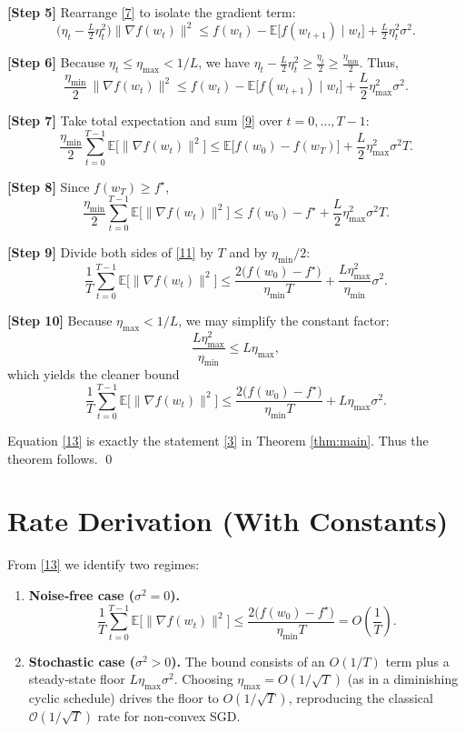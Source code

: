 \documentclass{article}
\newcommand{\E}{\mathbb{E}}
\begin{document}
\noindent\textbf{[Step 5]} Rearrange \eqref{7} to isolate the gradient term:
\[
\big(\eta_{t}-\tfrac{L}{2}\eta_{t}^{2}\big)\|\nabla f(w_{t})\|^{2}
\le f(w_{t})-\E\!\big[f(w_{t+1})\mid w_{t}\big]
   +\tfrac{L}{2}\eta_{t}^{2}\sigma^{2}.
\tag{8}
\]

\noindent\textbf{[Step 6]} Because $\eta_{t}\le\eta_{\max}<1/L$, we have
$\eta_{t}-\frac{L}{2}\eta_{t}^{2}\ge\frac{\eta_{t}}{2}\ge\frac{\eta_{\min}}{2}$.
Thus,
\[
\frac{\eta_{\min}}{2}\,\|\nabla f(w_{t})\|^{2}
\le f(w_{t})-\E\!\big[f(w_{t+1})\mid w_{t}\big]
   +\frac{L}{2}\eta_{\max}^{2}\sigma^{2}.
\tag{9}
\]

\noindent\textbf{[Step 7]} Take total expectation and sum \eqref{9} over $t=0,\dots,T-1$:
\[
\frac{\eta_{\min}}{2}\sum_{t=0}^{T-1}\E\!\big[\|\nabla f(w_{t})\|^{2}\big]
\le \E\!\big[f(w_{0})-f(w_{T})\big]
   +\frac{L}{2}\eta_{\max}^{2}\sigma^{2}T .
\tag{10}
\]

\noindent\textbf{[Step 8]} Since $f(w_{T})\ge f^{\star}$,
\[
\frac{\eta_{\min}}{2}\sum_{t=0}^{T-1}\E\!\big[\|\nabla f(w_{t})\|^{2}\big]
\le f(w_{0})-f^{\star}
   +\frac{L}{2}\eta_{\max}^{2}\sigma^{2}T .
\tag{11}
\]

\noindent\textbf{[Step 9]} Divide both sides of \eqref{11} by $T$ and by $\eta_{\min}/2$:
\[
\frac{1}{T}\sum_{t=0}^{T-1}\E\!\big[\|\nabla f(w_{t})\|^{2}\big]
\le
\frac{2\big(f(w_{0})-f^{\star}\big)}{\eta_{\min}T}
   +\frac{L\eta_{\max}^{2}}{\eta_{\min}}\sigma^{2}.
\tag{12}
\]

\noindent\textbf{[Step 10]} Because $\eta_{\max}<1/L$, we may simplify the constant factor:
\[
\frac{L\eta_{\max}^{2}}{\eta_{\min}}\le L\eta_{\max},
\]
which yields the cleaner bound
\[
\frac{1}{T}\sum_{t=0}^{T-1}\E\!\big[\|\nabla f(w_{t})\|^{2}\big]
\le
\frac{2\big(f(w_{0})-f^{\star}\big)}{\eta_{\min}T}
   +L\eta_{\max}\sigma^{2}.
\tag{13}
\]

Equation \eqref{13} is exactly the statement \eqref{3} in Theorem \ref{thm:main}.
Thus the theorem follows. \qed

\section*{Rate Derivation (With Constants)}
From \eqref{13} we identify two regimes:

\begin{enumerate}
\item \textbf{Noise‑free case ($\sigma^{2}=0$).}  
\[
\frac{1}{T}\sum_{t=0}^{T-1}\E\!\big[\|\nabla f(w_{t})\|^{2}\big]
\le \frac{2\big(f(w_{0})-f^{\star}\big)}{\eta_{\min}T}
= O\!\left(\frac{1}{T}\right).
\]

\item \textbf{Stochastic case ($\sigma^{2}>0$).}  
The bound consists of an $O(1/T)$ term plus a steady‑state floor $L\eta_{\max}\sigma^{2}$.
Choosing $\eta_{\max}=O(1/\sqrt{T})$ (as in a diminishing cyclic schedule) drives the floor
to $O(1/\sqrt{T})$, reproducing the classical $\mathcal{O}(1/\sqrt{T})$ rate for non‑convex SGD.
\end{enumerate}
\end{document}
